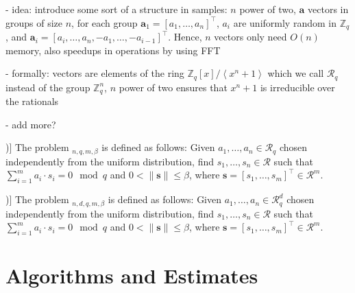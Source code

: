 \documentclass[
  a4paper,  %
  twoside,  %
  bibliography=totoc,
  headsepline,
  cleardoublepage=empty,
  parskip=half,
  draft=false
]{scrbook}
\begin{document}
- idea: introduce some sort of a structure in samples: $n$ power of two, $\mathbf{a}$ vectors in groups of size $n$, for each group $\mathbf{a}_1 = [a_1, \ldots, a_n]^\intercal$, $a_i$ are uniformly random in $\mathbb{Z}_q$, and $\mathbf{a}_i = [a_i, \ldots, a_n, -a_1, \ldots, -a_{i-1}]^\intercal$. Hence, $n$ vectors only need $O(n)$ memory, also speedups in operations by using FFT %

- formally: vectors are elements of the ring $\mathbb{Z}_q\left[x\right] / \left\langle x^n + 1 \right\rangle$ which we call $\mathcal{R}_q$ instead of the group $\mathbb{Z}_q^n$, $n$ power of two ensures that $x^n + 1$ is irreducible over the rationals%

- add more? %

\begin{definition}[Ring-SIS Problem [\citealp{LS15}, Definition 3.3])]
  The problem $_{n, q, m, \beta}$ is defined as follows: Given $a_1, \ldots, a_n \in \mathcal{R}_q$ chosen independently from the uniform distribution, find $s_1, \ldots, s_n \in \mathcal{R}$ such that $\sum_{i=1}^m a_i \cdot s_i = 0 \mod q$ and $0 < \| \mathbf{s}\| \leq \beta$, where $\mathbf{s} = \left[s_1, \ldots, s_m\right]^\intercal \in \mathcal{R}^m$.
\end{definition} %

\begin{definition}[Module-SIS Problem [\citealp{LS15}, Definition 3.3])]
  The problem $_{n, d, q, m, \beta}$ is defined as follows: Given $a_1, \ldots, a_n \in \mathcal{R}_q^d$ chosen independently from the uniform distribution, find $s_1, \ldots, s_n \in \mathcal{R}$ such that $\sum_{i=1}^m a_i \cdot s_i = 0\mod q$ and $0 < \| \mathbf{s}\| \leq \beta$, where $\mathbf{s} = \left[s_1, \ldots, s_m\right]^\intercal \in \mathcal{R}^m$.
\end{definition} %












\chapter{Algorithms and Estimates}

\end{document}
